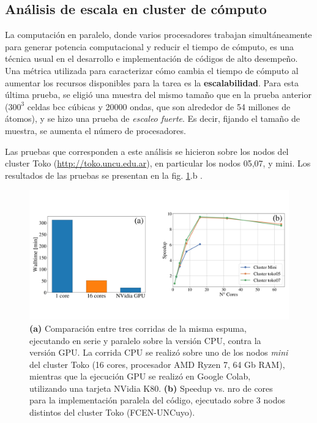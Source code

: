 \documentclass{article}
\begin{document}
\subsection{Análisis de escala en cluster de cómputo}

La computación en paralelo, donde varios procesadores trabajan simultáneamente para generar potencia computacional y reducir el tiempo de cómputo, es una técnica usual en el desarrollo e implementación de códigos de alto desempeño. Una métrica utilizada para caracterizar cómo cambia el tiempo de cómputo al aumentar los recursos disponibles para la tarea es la \textbf{escalabilidad}. Para esta última prueba, se eligió una muestra del mismo tamaño que en la prueba anterior ($300^3$ celdas bcc cúbicas y 20000 ondas, que son alrededor de 54 millones de átomos), y se hizo una prueba de \textit{escaleo fuerte}. Es decir, fijando el tamaño de muestra, se aumenta el número de procesadores. 

Las pruebas que corresponden a este análisis se hicieron sobre los nodos del cluster Toko (\url{http://toko.uncu.edu.ar}), en particular los nodos 05,07, y mini. Los resultados de las pruebas se presentan en la fig. \ref{fig:Benchmark2_StrScaling}.b . 

\begin{figure}[H]
    \centering
    \includegraphics[width=\textwidth]{figs/Benchmark2_strScaling.jpg}
    \caption{\textbf{(a)} Comparación entre tres corridas de la misma espuma, ejecutando en serie y paralelo sobre la versión CPU, contra la versión GPU. La corrida CPU se realizó sobre uno de los nodos \textit{mini} del cluster Toko (16 cores, procesador AMD Ryzen 7, 64 Gb RAM), mientras que la ejecución GPU se realizó en Google Colab, utilizando una tarjeta NVidia K80. \textbf{(b)} Speedup vs. nro de cores para la implementación paralela del código, ejecutado sobre 3 nodos distintos del cluster Toko (FCEN-UNCuyo).}
    \label{fig:Benchmark2_StrScaling}
\end{figure}
\end{document}
